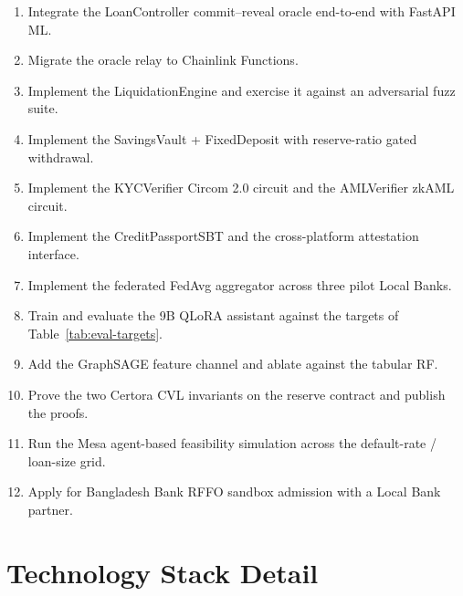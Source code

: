 \documentclass[12pt,a4paper]{report}
\begin{document}
\begin{enumerate}[leftmargin=*,itemsep=2pt]
    \item Integrate the LoanController commit--reveal oracle end-to-end with FastAPI ML.
    \item Migrate the oracle relay to Chainlink Functions.
    \item Implement the LiquidationEngine and exercise it against an adversarial fuzz suite.
    \item Implement the SavingsVault + FixedDeposit with reserve-ratio gated withdrawal.
    \item Implement the KYCVerifier Circom 2.0 circuit and the AMLVerifier zkAML circuit.
    \item Implement the CreditPassportSBT and the cross-platform attestation interface.
    \item Implement the federated FedAvg aggregator across three pilot Local Banks.
    \item Train and evaluate the 9B QLoRA assistant against the targets of Table~\ref{tab:eval-targets}.
    \item Add the GraphSAGE feature channel and ablate against the tabular RF.
    \item Prove the two Certora CVL invariants on the reserve contract and publish the proofs.
    \item Run the Mesa agent-based feasibility simulation across the default-rate / loan-size grid.
    \item Apply for Bangladesh Bank RFFO sandbox admission with a Local Bank partner.
\end{enumerate}

\appendix

\chapter{Technology Stack Detail}
\label{app:stack}
\end{document}
